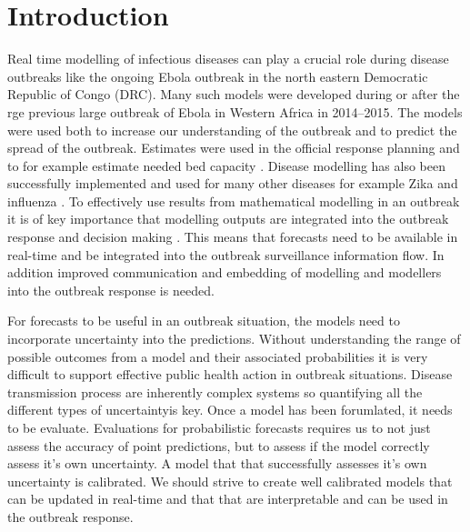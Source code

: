 \documentclass[12pt]{article}
\begin{document}
\newpage

\tableofcontents

\newpage

\section{Introduction}


Real time modelling of infectious diseases can play a crucial role during disease outbreaks like the ongoing Ebola outbreak in the north eastern Democratic Republic of Congo (DRC)\cite{heesterbeekModelingInfectiousDisease2015,riversUsingOutbreakScience2019a}. Many such models were developed during or after the rge previous large outbreak of Ebola in Western Africa in 2014--2015\cite{chretienMathematicalModelingWest}. The models were used both to increase our understanding of the outbreak and to predict the spread of the outbreak. Estimates were used in the official response planning\cite{whoebolaresponseteamEbolaVirusDisease2014} and to for example estimate needed bed capacity \cite{camachoTemporalChangesEbola2015}. Disease modelling has also been successfully implemented and used for many other diseases for example Zika \cite{kobresSystematicReviewEvaluation2019} and influenza \cite{chretienInfluenzaForecastingHuman2014}. To effectively use results from mathematical modelling in an outbreak it is of key importance that modelling outputs are integrated into the outbreak response and decision making \cite{riversUsingOutbreakScience2019a}. This means that forecasts need to be available in real-time and be integrated into the outbreak surveillance information flow. In addition improved communication and embedding of modelling and modellers into the outbreak response is needed. 

For forecasts to be useful in an outbreak situation, the models need to incorporate uncertainty into the predictions\cite{funkAssessingPerformanceRealtime2019, weiCalibrationTestsCount2014,gneitingEditorialProbabilisticForecasting2008}. Without understanding the range of possible outcomes from a model and their associated probabilities it is very difficult to support effective public health action in outbreak situations. Disease transmission process are inherently complex systems so quantifying all the different types of uncertaintyis key. Once a model has been forumlated, it needs to be evaluate. Evaluations for probabilistic forecasts requires us to not just assess the accuracy of point predictions, but to assess if the model correctly assess it's own uncertainty. A model that that successfully assesses it's own uncertainty is calibrated. We should strive to create well calibrated models that can be updated in real-time and that that are interpretable and can be used in the outbreak response. 
\end{document}
